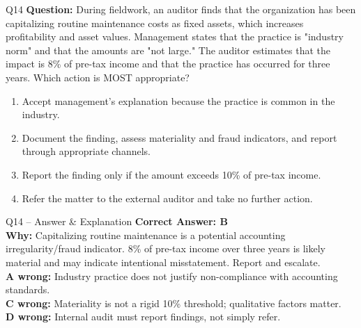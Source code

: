 \documentclass[aspectratio=169,10pt]{beamer}
\begin{document}
	\begin{frame}[t]{Q14}
		\small
		\textbf{Question:} During fieldwork, an auditor finds that the organization has been capitalizing routine maintenance costs as fixed assets, which increases profitability and asset values. Management states that the practice is "industry norm" and that the amounts are "not large." The auditor estimates that the impact is 8\% of pre-tax income and that the practice has occurred for three years. Which action is MOST appropriate?
		\begin{enumerate}[label=\Alph*.,itemsep=1pt,topsep=2pt]
			\item Accept management's explanation because the practice is common in the industry.
			\item Document the finding, assess materiality and fraud indicators, and report through appropriate channels.
			\item Report the finding only if the amount exceeds 10\% of pre-tax income.
			\item Refer the matter to the external auditor and take no further action.
		\end{enumerate}
	\end{frame}
	
	\begin{frame}[t]{Q14 -- Answer \& Explanation}
		\small
		\textbf{Correct Answer: B} \\[4pt]
		\textbf{Why:} Capitalizing routine maintenance is a potential accounting irregularity/fraud indicator. 8\% of pre-tax income over three years is likely material and may indicate intentional misstatement. Report and escalate. \\[4pt]
		\textbf{A wrong:} Industry practice does not justify non-compliance with accounting standards. \\[2pt]
		\textbf{C wrong:} Materiality is not a rigid 10\% threshold; qualitative factors matter. \\[2pt]
		\textbf{D wrong:} Internal audit must report findings, not simply refer.
	\end{frame}
	
\end{document}
